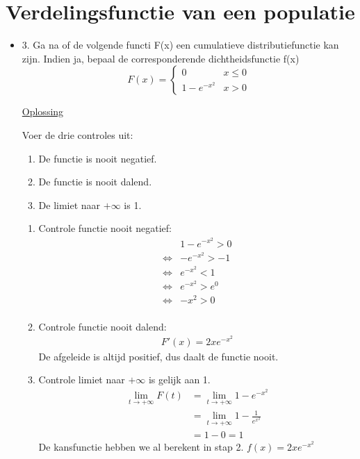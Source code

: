 \documentclass[12pt]{report}
\newcommand{\exercise}[2]{
  #1
  

  \underline{Oplossing}
  
  #2
  
    \hrulefill
}
\begin{document}
\chapter{Verdelingsfunctie van een populatie}
\begin{itemize}
 \item{\exercise{3. Ga na of de volgende functi F(x) een cumulatieve distributiefunctie kan zijn. Indien ja, bepaal de corresponderende dichtheidsfunctie f(x)
 $$F(x) = \begin{cases}
           0 & x \leq 0 \\
           1 - e^{-x^{2}} & x > 0
          \end{cases}
$$}{
Voer de drie controles uit:
\begin{enumerate}
 \item De functie is nooit negatief.
 \item De functie is nooit dalend.
 \item De limiet naar $+\infty$ is 1.
\end{enumerate}
\begin{enumerate}
\item Controle functie nooit negatief:
\begin{equation*}
 \begin{split}
  & 1-e^{-x^{2}} > 0 \\
  \Leftrightarrow & -e^{-x^{2}} > - 1 \\
  \Leftrightarrow & e^{-x^{2}} < 1 \\
  \Leftrightarrow & e^{-x^{2}} > e^0 \\
  \Leftrightarrow & -x^{2} > 0 \\
 \end{split}
\end{equation*}
\item Controle functie nooit dalend:
\begin{equation*}
 \begin{split}
  F'(x) = 2xe^{-x^2}
 \end{split}
\end{equation*}
De afgeleide is altijd positief, dus daalt de functie nooit.
\item Controle limiet naar $+\infty$ is gelijk aan 1.
\begin{equation*}
 \begin{split}
  \lim_{t\to+\infty}F(t) & = \lim_{t\to+\infty}1 - e^{-x^{2}} \\
                         & =  \lim_{t\to+\infty}1 - \frac{1}{e^{x^{2}}} \\
                         & = 1 - 0 = 1
 \end{split}
\end{equation*}
De kansfunctie hebben we al berekent in stap 2. $f(x) = 2xe^{-x^{2}}$
\end{enumerate}


}}
\end{itemize}
\end{document}
